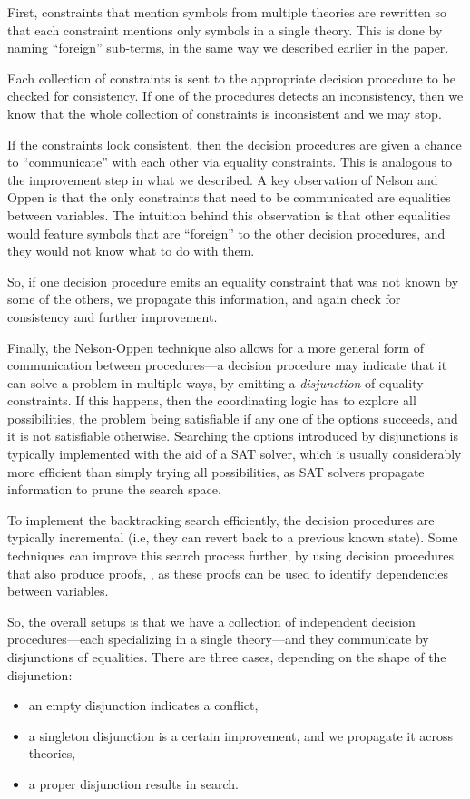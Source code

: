 \documentclass{sigplanconf}
\begin{document}
First, constraints that mention symbols from multiple theories are
rewritten so that each constraint mentions only symbols in a single theory.
This is done by naming ``foreign'' sub-terms, in the same way we described
earlier in the paper.

Each collection of constraints is sent to the appropriate decision
procedure to be checked for consistency.  If one of the procedures
detects an inconsistency, then we know that the whole collection of
constraints is inconsistent and we may stop.

If the constraints look consistent, then the decision procedures
are given a chance to ``communicate'' with each other via equality
constraints.  This is analogous to the improvement step in what we
described.  A key observation of Nelson and Oppen is that the only
constraints that need to be communicated are equalities between variables.
The intuition behind this observation is that other equalities would
feature symbols that are ``foreign'' to the other decision procedures,
and they would not know what to do with them.

So, if one decision procedure emits an equality constraint that was not
known by some of the others, we propagate this information, and again
check for consistency and further improvement.

Finally, the Nelson-Oppen technique also allows for a more general
form of communication between procedures---a decision procedure may
indicate that it can solve a problem in multiple ways, by emitting
a {\em disjunction} of equality constraints.  If this happens,
then the coordinating logic has to explore all possibilities, the problem being
satisfiable if any one of the options succeeds, and it is not satisfiable
otherwise.  Searching the options introduced by disjunctions is typically
implemented with the aid of a SAT solver, which is usually considerably
more efficient than simply trying all possibilities, as SAT solvers
propagate information to prune the search space.

To implement the backtracking search efficiently, the decision procedures
are typically incremental (i.e, they can revert back to a previous
known state).  Some techniques can improve this search process further,
by using decision procedures that also produce proofs, \cite{cvc4-lin-arith},
as these proofs can be used to identify dependencies between variables.

So, the overall setups is that we have a collection of independent
decision procedures---each specializing in a single theory---and
they communicate by disjunctions of equalities.  There are three cases,
depending on the shape of the disjunction:
\begin{itemize}
\item an empty disjunction indicates a conflict,
\item a singleton disjunction is a certain improvement, and we propagate
it across theories,
\item a proper disjunction results in search.
\end{itemize}
\end{document}
